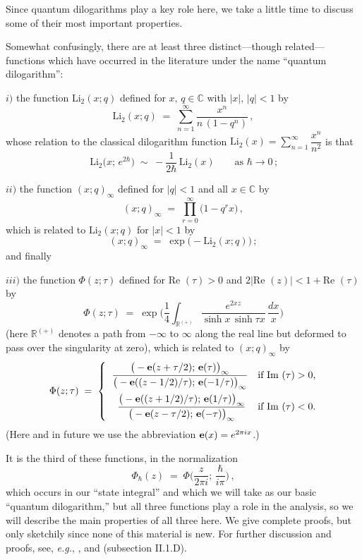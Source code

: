 \documentclass[hyper]{JHEP3}
\def\re{\mbox{Re }}
\def\im{\mbox{Im }}
\newcommand{\C}{{\mathbb{C}}}
\newcommand\be{\begin{equation}}
\newcommand\ee{\end{equation}}
\def\={\;=\;}
\def\Li{\text{Li}_2}
\def\t{\tau}
\def\e{\bold e}
\def\Rp{\mathbb R^{(+)}}
\begin{document}
Since quantum dilogarithms play a key role here, we take a little time to discuss some of
their most important properties.

Somewhat confusingly, there are at least three distinct---though related---functions
which have occurred in the literature under the name ``quantum dilogarithm'':

$i)$ the function $\Li(x;q)$ defined for $x,\,q\in\C$ with $|x|,\,|q|<1$ by
  \be\label{Li2} \Li(x;q)\=\sum_{n=1}^\infty\frac{x^n}{n\,(1-q^n)}\,, \ee
whose relation to the classical dilogarithm function $\Li(x)=\sum\limits_{n=1}^\infty\dfrac{x^n}{n^2}$ is that
  \be\label{asymp1} \Li\bigl(x;\,e^{2\hbar}\bigr)\;\sim\;-\frac1{2\hbar}\,\Li(x)\qquad\text{as $\hbar\to0\,$;}\ee

$ii)$ the function $(x;q)_\infty$ defined for $|q|<1$ and all $x\in\mathbb C$ by
  \be\label{qPoch} (x;q)_\infty\=\prod_{r=0}^\infty\bigl(1-q^rx)\,,\ee
which is related to $\Li(x;q)$ for $|x|<1$ by
  \be\label{expLi2}(x;q)_\infty\;=\;\exp\bigl(-\Li(x;q)\bigr)\,;\ee
and finally

$iii)$ the function $\Phi(z;\t)$ defined for $\re(\t)>0$ and $2|\re(z)|<1+\re(\t)$ by
   \be\label{qdl_integral} \Phi(z;\t)\=\exp\biggl(\frac14\int_{\Rp}
   \frac{e^{2xz}}{\sinh x\,\sinh\t x}\,\frac{dx}x\biggr) \ee
(here $\Rp$ denotes a path from $-\infty$ to $\infty$ along the
real line but deformed to pass over the singularity at zero), which
is related to $(x;q)_\infty$ by
  \be\label{qdl_quot} \Phi(z;\t)\=\begin{cases}
  \phantom x\dfrac{\big(-\e(z+\t/2);\,\e(\t)\big)_\infty}{\big(-\e((z-1/2)/\t);\,\e(-1/\t)\big)_\infty\vphantom{\int_{R_R}}}
  &\text{if $\im(\t)>0$,} \\ \phantom{xx}
  \dfrac{\vphantom{\int^{\Rp}}\big(-\e((z+1/2)/\t);\,\e(1/\t)\big)_\infty}{\big(-\e(z-\t/2);\,\e(-\t)\big)_\infty}
  & \text{if $\im(\t)<0$.}    \end{cases}\ee
(Here and in future we use the abbreviation $\e(x)=e^{2\pi ix}$.)

It is the third of these functions, in the normalization
  \be \Phi_\hbar(z)\=\Phi\bigl(\frac z{2\pi i};\,\frac{\hbar}{i\pi}\bigr)\,, \label{qdl-hbar} \ee
which occurs in our ``state integral'' and which we will take as our basic ``quantum dilogarithm,''
but all three functions play a role in the analysis, so we will describe the main properties of all three here.
We give complete proofs, but only sketchily since none of this material is new.  For further discussion and proofs,
see, {\it e.g.}, \cite{faddeev-1994, faddeev-1999, faddeev-2001-219, volkov-2003, goncharov-2007},
and \cite{zagDilog} (subsection II.1.D).
\end{document}
